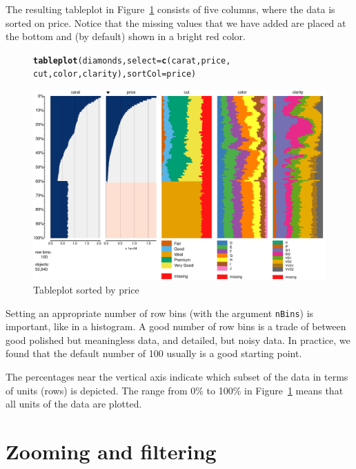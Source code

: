 \documentclass[11pt, fleqn, a4paper]{article}\usepackage{graphicx, color}
\makeatletter
\def\maxwidth{ %
  \ifdim\Gin@nat@width>\linewidth
    \linewidth
  \else
    \Gin@nat@width
  \fi
}
\newcommand{\hlfunctioncall}[1]{\textcolor[rgb]{0.501960784313725,0,0.329411764705882}{\textbf{#1}}}%
\newenvironment{kframe}{%
 \def\at@end@of@kframe{}%
 \ifinner\ifhmode%
  \def\at@end@of@kframe{\end{minipage}}%
  \begin{minipage}{\columnwidth}%
 \fi\fi%
 \def\FrameCommand##1{\hskip\@totalleftmargin \hskip-\fboxsep
 \colorbox{shadecolor}{##1}\hskip-\fboxsep
     \hskip-\linewidth \hskip-\@totalleftmargin \hskip\columnwidth}%
 \MakeFramed {\advance\hsize-\width
   \@totalleftmargin\z@ \linewidth\hsize
   \@setminipage}}%
 {\par\unskip\endMakeFramed%
 \at@end@of@kframe}
\newenvironment{knitrout}{}{} %
\makeatother
\begin{document}
The resulting tableplot in Figure~\ref{fig:tp2} consists of five columns, where the data is sorted on price. Notice that the missing values that we have added are placed at the bottom and (by default) shown in a bright red color.

\begin{figure}[!htp]
\begin{knitrout}
\color{fgcolor}\begin{kframe}
\begin{alltt}
\hlfunctioncall{tableplot}(diamonds, select = \hlfunctioncall{c}(carat, price, 
    cut, color, clarity), sortCol = price)
\end{alltt}
\end{kframe}
\includegraphics[width=\maxwidth]{figure/chunk3} 

\end{knitrout}

\caption{Tableplot sorted by price}
\label{fig:tp2}
\end{figure}

Setting an appropriate number of row bins (with the argument {\tt nBins}) is important, like in a histogram. A good number of row bins is a trade of between good polished but meaningless data, and detailed, but noisy data. In practice, we found that the default number of 100 usually is a good starting point.

The percentages near the vertical axis indicate which subset of the data in terms of units (rows) is depicted. The range from 0\% to 100\% in Figure~\ref{fig:tp2} means that all units of the data are plotted.

\section{Zooming and filtering}
\end{document}
